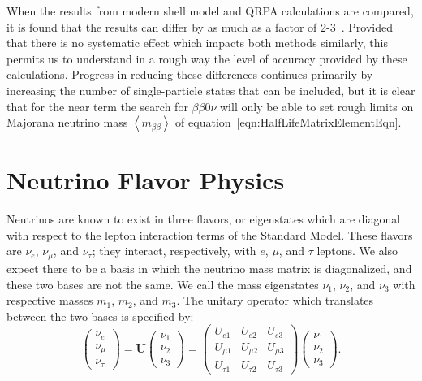 When the results from modern shell model and QRPA calculations are compared, it is found that the results can differ by as much as a factor of 2-3~\cite{RMPbb0n}.  Provided that there is no systematic effect which impacts both methods similarly, this permits us to understand in a rough way the level of accuracy provided by these calculations.  Progress in reducing these differences continues primarily by increasing the number of single-particle states that can be included, but it is clear that for the near term the search for $\beta\beta 0\nu$ will only be able to set rough limits on Majorana neutrino mass $\left<m_{\beta\beta}\right>$ of equation~\ref{eqn:HalfLifeMatrixElementEqn}.

\section{Neutrino Flavor Physics}\label{sec:NeutrinoFlavorPhysics}

Neutrinos are known to exist in three flavors, or eigenstates which are diagonal with respect to the lepton interaction terms of the Standard Model.  These flavors are $\nu_e$, $\nu_\mu$, and $\nu_\tau$; they interact, respectively, with $e$, $\mu$, and $\tau$ leptons.  We also expect there to be a basis in which the neutrino mass matrix is diagonalized, and these two bases are not the same.  We call the mass eigenstates $\nu_1$, $\nu_2$, and $\nu_3$ with respective masses $m_1$, $m_2$, and $m_3$.  The unitary operator which translates between the two bases is specified by:
\begin{equation} \label{eqn:ShortDefinitionOfU}
\begin{pmatrix} \nu_e \\ \nu_\mu \\ \nu_\tau \end{pmatrix}
=
\mathbf{U}
\begin{pmatrix} \nu_1 \\ \nu_2 \\ \nu_3 \end{pmatrix}
=
\begin{pmatrix}
U_{e1} & U_{e2} & U_{e3} \\
U_{\mu1} & U_{\mu2} & U_{\mu3} \\
U_{\tau1} & U_{\tau2} & U_{\tau3}
\end{pmatrix}
\begin{pmatrix} \nu_1 \\ \nu_2 \\ \nu_3 \end{pmatrix}.
\end{equation}

